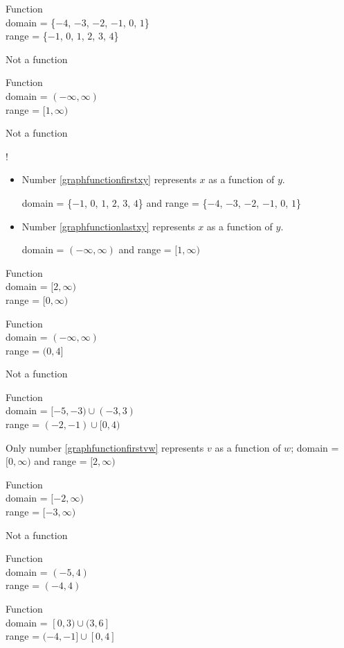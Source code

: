 \begin{tasks}[resume]
\task* Function \\ domain = \{$-4$, $-3$, $-2$, $-1$, $0$, $1$\} \\ range = \{$-1$, $0$, $1$, $2$, $3$, $4$\}

\task Not a function

\task* Function \\ domain = $(-\infty, \infty)$ \\ range = $[1, \infty)$

\task Not a function 

\task! 
\begin{itemize}

\item Number \ref{graphfunctionfirstxy} represents $x$ as a function of $y$.

domain  = \{$-1$, $0$, $1$, $2$, $3$, $4$\} and range = \{$-4$, $-3$, $-2$, $-1$, $0$, $1$\}

\item Number \ref{graphfunctionlastxy} represents $x$ as a function of $y$.

domain = $(-\infty, \infty)$  and range = $[1, \infty)$

\end{itemize}

\task Function \\ domain = $[2, \infty)$ \\ range = $[0, \infty)$

\task Function \\ domain = $(-\infty, \infty)$ \\ range = $(0, 4]$

\task Not a function

\task Function \\ domain = $[-5,-3) \cup(-3, 3)$ \\ range = $(-2, -1) \cup [0, 4)$

\task Only number \ref{graphfunctionfirstvw} represents $v$ as a function of $w$;  domain = $[0, \infty)$ and range = $[2, \infty)$

\task  Function \\  domain =  $[-2, \infty)$ \\ range = $[-3, \infty)$

\task Not a function

\task Function \\  domain =  $(-5, 4)$ \\ range = $(-4, 4)$

\task  Function \\ domain = $[0,3) \cup (3,6]$ \\ range = $(-4,-1] \cup [0,4]$


\end{tasks}
